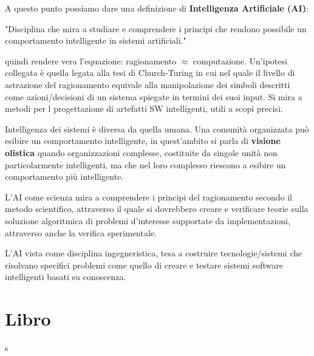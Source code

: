 \documentclass[a4paper]{extarticle}
\begin{document}
A questo punto possiamo dare una definizione di \textbf{Intelligenza Artificiale (AI)}:
\begin{center}
	"Disciplina che mira a studiare e comprendere i principi che rendono possibile un comportamento intelligente in sistemi artificiali."
\end{center}
quindi rendere vera l'equazione: ragionamento $\approx$ computazione. Un'ipotesi collegata è quella legata alla tesi di Church-Turing in cui nel quale il livello di astrazione del ragionamento equivale alla manipolazione dei simboli descritti come azioni/decisioni di un sistema spiegate in termini dei suoi input. Si mira a metodi per l progettazione di artefatti SW intelligenti, utili a scopi precisi.

Intelligenza dei sistemi è diversa da quella umana. Una comunità organizzata può esibire un comportamento intelligente, in quest'ambito si parla di \textbf{visione olistica} quando organizzazioni complesse, costituite da singole unità non particolarmente intelligenti, ma che nel loro complesso riescono a esibire un comportamento più intelligente.

L'AI come scienza mira a comprendere i principi del ragionamento secondo il metodo scientifico, attraverso il quale si dovrebbero creare e verificare teorie sulla soluzione algoritmica di problemi d'interesse supportate da implementazioni, attraverso anche la verifica sperimentale.

L'AI vista come disciplina ingegneristica, tesa a costruire tecnologie/sistemi che risolvano specifici problemi come quello di creare e testare sistemi software intelligenti basati su conoscenza.
\newpage
\section{Libro}s
\end{document}
